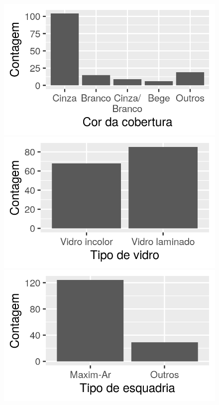 \documentclass[brazil,hardcopy,openany]{ufscthesis} %
\begin{document}
\begin{figure}[H]
\begin{minipage}{.33\textwidth}
	\end{minipage}
	\centering
	\begin{minipage}{.33\textwidth}
		\centering
		\includegraphics[width=\linewidth]{img/hist_cor_cobertura.png}
	\end{minipage}%
	\begin{minipage}{.33\textwidth}
		\centering
		\includegraphics[width=\linewidth]{img/hist_tipo_vidro.png}
	\end{minipage}%
	\begin{minipage}{.33\textwidth}
		\centering
		\includegraphics[width=\linewidth]{img/hist_esquadria.png}

\end{minipage}
\end{figure}
\end{document}
